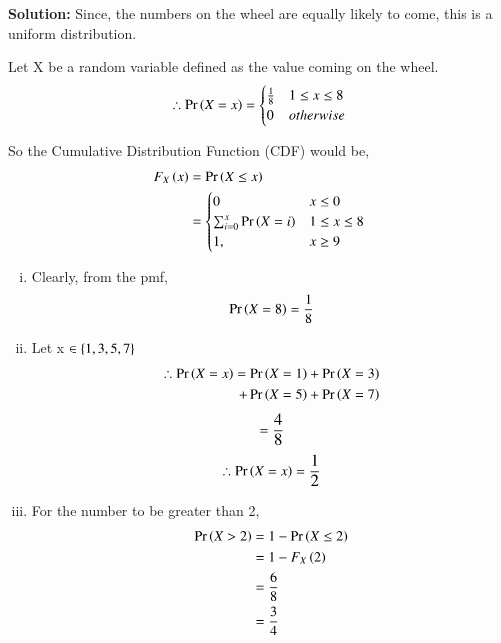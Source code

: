 \documentclass[journal,12pt,twocolumn]{IEEEtran}
\newcommand*\textfrac[2]{
  \frac{\text{#1}}{\text{#2}}
}
\begin{document}
{\begin{tikzpicture}
\end{tikzpicture}

\textbf{Solution:}
Since, the numbers on the wheel are equally likely to come, this is a uniform distribution.

Let X be a random variable defined as the value coming on the wheel.
\begin{align}
    \therefore \pr{X = x} =
        \begin{cases}
            \frac{\large1}{\large8} & 1\le x\le 8
            \\ 0 & otherwise
        \end{cases}
    \nonumber
\end{align}

So the Cumulative Distribution Function (CDF) would be,
\begin{align}
    F_{X} \brak{x} &= \pr{X \leq x} \nonumber
    \\ &=
    \begin{cases}
        0 & x \le 0\\
        \sum_{i=0}^{x} {\pr{X=i}} & 1 \le x \le 8\\
        1, & x\ge 9
    \end{cases}
\nonumber    
\end{align}

\begin{enumerate}[(i)]
    \item Clearly, from the pmf,     
    \begin{align}
        \pr{X=8} = \frac{\large 1}{\large 8}
        \nonumber
     \end{align}
        
    \item Let x $\in \cbrak{1,3,5,7}$
    \begin{align}
        \therefore \pr{X=x} = \pr{X=1} + \pr{X=3} \nonumber
        \\ + \pr{X=5} + \pr{X=7}  \nonumber
    \end{align}
    \begin{align}
        =  \textfrac {\large 4}{\large 8} 
        \nonumber
    \end{align}
    \begin{align}
        \therefore \pr{X = x} = \textfrac {\large 1}{\large 2} 
        \nonumber
    \end{align}
    
    \item For the number to be greater than 2,
    \begin{align}
    \pr{X > 2} &= 1 - \pr{X \le 2}  \nonumber\\
    &= 1 - F_{X}\brak{2}  \nonumber\\
    &= \frac{6}{8}  \nonumber\\
    &= \frac{3}{4}  \nonumber
    \end{align}
    

\end{enumerate}}
\end{document}
